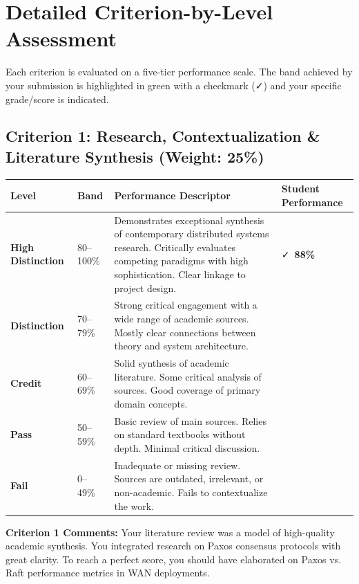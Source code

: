 \section*{Detailed Criterion-by-Level Assessment}

Each criterion is evaluated on a five-tier performance scale. The band achieved by your submission is highlighted in green with a checkmark (\faCheck) and your specific grade/score is indicated.

\subsection*{Criterion 1: Research, Contextualization \& Literature Synthesis (Weight: 25\%)}

\noindent
\begin{tabularx}{\textwidth}{@{} >{\bfseries}l p{1.8cm} X >{\centering\arraybackslash}p{1.6cm} @{}}
\toprule
Level & Band & Performance Descriptor & Student Performance \\
\midrule
High Distinction & 80--100\% & Demonstrates exceptional synthesis of contemporary distributed systems research. Critically evaluates competing paradigms with high sophistication. Clear linkage to project design. & \cellcolor{success!10}\faCheck\ \textbf{88\%} \\
\midrule
Distinction & 70--79\% & Strong critical engagement with a wide range of academic sources. Mostly clear connections between theory and system architecture. & \\
\midrule
Credit & 60--69\% & Solid synthesis of academic literature. Some critical analysis of sources. Good coverage of primary domain concepts. & \\
\midrule
Pass & 50--59\% & Basic review of main sources. Relies on standard textbooks without depth. Minimal critical discussion. & \\
\midrule
Fail & 0--49\% & Inadequate or missing review. Sources are outdated, irrelevant, or non-academic. Fails to contextualize the work. & \\
\bottomrule
\end{tabularx}

\vspace{0.8em}
\begin{tcolorbox}[colback=lightbg, colframe=bordercolor, arc=2pt, left=8pt, right=8pt, top=6pt, bottom=6pt]
\small \textbf{Criterion 1 Comments:} Your literature review was a model of high-quality academic synthesis. You integrated research on Paxos consensus protocols with great clarity. To reach a perfect score, you should have elaborated on Paxos vs. Raft performance metrics in WAN deployments.
\end{tcolorbox}


